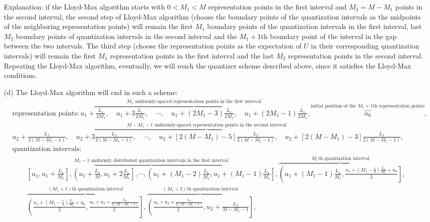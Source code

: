 \documentclass{assignment}
\begin{document}
\begin{sol}
\begin{itemize}
        Explanation: if the Lloyd-Max algorithm starts with $0<M_1<M$ representation points in the first interval and $M_2=M-M_1$ points in the second interval, the second step of Lloyd-Max algorithm (choose the boundary points of the quantization intervals as the midpoints of the neighboring representation points) will remain the first $M_1$ boundary points of the quantization intervals in the first interval, last $M_2$ boundary points of quantization intervals in the second interval and the $M_1+1$th boundary point of the interval in the gap between the two intervals. The third step (choose the representation points as the expectation of $U$ in their corresponding quantization intervals) will remain the first $M_1$ representation points in the first interval and the last $M_2$ representation points in the second interval. Repeating the Lloyd-Max algorithm, eventually, we will reach the quantizer scheme described above, since it satisfies the Lloyd-Max conditions.
        \item[(d)] The Lloyd-Max algorithm will end in such a scheme:
        {\scriptsize
        \begin{align*}
            &\text{representation points}:\overbrace{u_1+\frac{L_1}{2M_1},\quad u_1+3\frac{L_1}{2M_1},\quad\cdots,\quad u_1+(2M_1-3)\frac{L_1}{2M_1},\quad u_1+(2M_1-1)\frac{L_1}{2M_1}}^{M_1\text{ uniformly-spaced representation points in the first interval}},\overbrace{u_0}^{\text{initial position of the }M_1+1\text{th representation points}},\\
            &\overbrace{u_2+\frac{L_2}{2(M-M_1-1)},\quad u_2+3\frac{L_2}{2(M-M_1-1)},\quad\cdots,\quad u_2+[2(M-M_1)-5]\frac{L_2}{2(M-M_1-1)},\quad u_2+[2(M-M_1)-3]\frac{L_2}{2(M-M_1-1)}}^{M-M_1-1\text{ uniformly-spaced representation points in the second interval}},\\
            &\text{quantization intervals}:
        \end{align*}
        \begin{align*}
            &\overbrace{\left[u_1,u_1+\frac{L_1}{M_1}\right],\left(u_1+\frac{L_1}{M},u_1+2\frac{L_1}{M_1}\right],\cdots,\left(u_1+(M_1-2)\frac{L_1}{M_1},u_1+(M_1-1)\frac{L_1}{M_1}\right]}^{M_1-1\text{ uniformly distributed quantization intervals in the first interval}},\overbrace{\left(u_1+(M_1-1)\frac{L_1}{M_1},\frac{u_1+(M_1-\frac{1}{2})\frac{L_1}{M_1}+u_0}{2}\right]}^{M_1\text{th quantization interval}},\\
            &\overbrace{\left(\frac{u_1+(M_1-\frac{1}{2})\frac{L_1}{M_1}+u_0}{2},\frac{u_0+u_2+\frac{L_2}{2(M-M_1-1)}}{2}\right]}^{(M_1+1)\text{th quantization interval}},\overbrace{\left(\frac{u_0+u_2+\frac{L_2}{2(M-M_1-1)}}{2},u_2+\frac{L_2}{M-M_1-1}\right]}^{(M_1+2)\text{th quantization interval}},\\

\end{align*}}
\end{itemize}
\end{sol}
\end{document}
